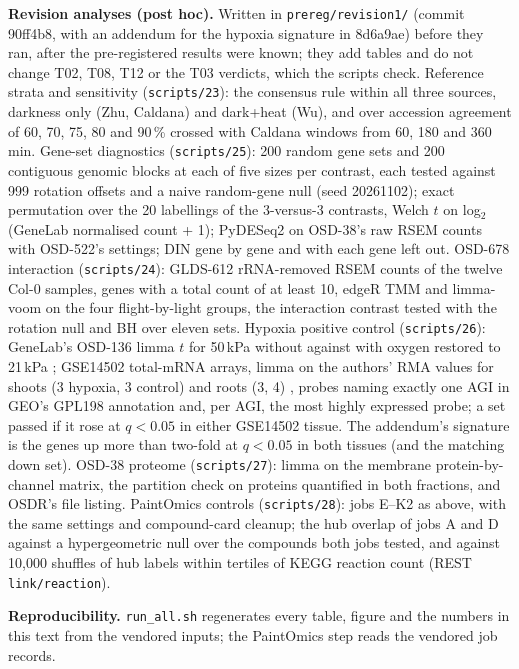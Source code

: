 \documentclass{npjlayout}
\begin{document}
\textbf{Revision analyses (post hoc).} Written in \texttt{prereg/revision1/} (commit 90ff4b8, with an
addendum for the hypoxia signature in 8d6a9ae) before they ran, after the pre-registered results
were known; they add tables and do not change T02, T08, T12 or the T03 verdicts, which the scripts
check. Reference strata and sensitivity (\texttt{scripts/23}): the consensus rule within all three
sources, darkness only (Zhu, Caldana) and dark+heat (Wu), and over accession agreement of 60, 70, 75,
80 and 90\,\% crossed with Caldana windows from 60, 180 and 360\,min. Gene-set diagnostics
(\texttt{scripts/25}): 200 random gene sets and 200 contiguous genomic blocks at each of five sizes
per contrast, each tested against 999 rotation offsets and a naive random-gene null (seed
20261102); exact permutation over the 20 labellings of the 3-versus-3 contrasts, Welch $t$ on
log$_2$(GeneLab normalised count + 1); PyDESeq2 on OSD-38's raw RSEM counts with OSD-522's settings;
DIN gene by gene and with each gene left out. OSD-678 interaction (\texttt{scripts/24}): GLDS-612
rRNA-removed RSEM counts of the twelve Col-0 samples, genes with a total count of at least 10, edgeR
TMM \citep{robinson2010} and limma-voom \citep{law2014,ritchie2015} on the four flight-by-light
groups, the interaction contrast tested with the rotation null and BH over eleven sets. Hypoxia
positive control (\texttt{scripts/26}): GeneLab's OSD-136 limma $t$ for 50\,kPa without against
with oxygen restored to 21\,kPa \citep{osd136,zhou2017}; GSE14502 total-mRNA arrays, limma on the
authors' RMA values for shoots (3 hypoxia, 3 control) and roots (3, 4) \citep{mustroph2009,gse14502},
probes naming exactly one AGI in GEO's GPL198 annotation and, per AGI, the most highly expressed
probe; a set passed if it rose at $q<0.05$ in either GSE14502 tissue. The addendum's signature is
the genes up more than two-fold at $q<0.05$ in both tissues (and the matching down set). OSD-38
proteome (\texttt{scripts/27}): limma on the membrane protein-by-channel matrix, the partition check
on proteins quantified in both fractions, and OSDR's file listing. PaintOmics controls
(\texttt{scripts/28}): jobs E--K2 as above, with the same settings and compound-card cleanup;
the hub overlap of jobs A and D against a hypergeometric null over the compounds both jobs tested,
and against 10{,}000 shuffles of hub labels within tertiles of KEGG reaction count (REST
\texttt{link/reaction}).

\textbf{Reproducibility.} \texttt{run\_all.sh} regenerates every table, figure and the numbers in
this text from the vendored inputs; the PaintOmics step reads the vendored job records.
\end{document}
